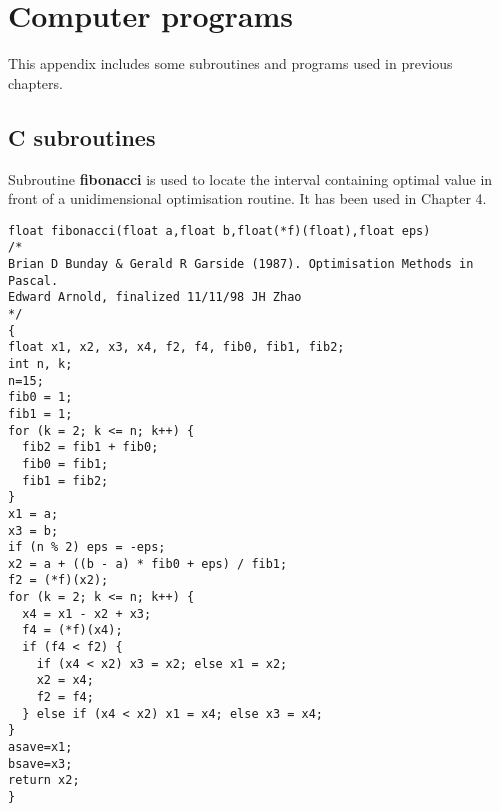\chapter{Computer programs}\label{programs}

This appendix includes some subroutines and programs used in previous chapters.

\section{C subroutines}
Subroutine {\bf fibonacci} is used to locate the interval containing optimal
value in front of a unidimensional optimisation routine.  It has been used in
Chapter 4.
\begin{verbatim}
float fibonacci(float a,float b,float(*f)(float),float eps)
/*
Brian D Bunday & Gerald R Garside (1987). Optimisation Methods in Pascal.
Edward Arnold, finalized 11/11/98 JH Zhao
*/
{
float x1, x2, x3, x4, f2, f4, fib0, fib1, fib2;
int n, k;
n=15;
fib0 = 1;
fib1 = 1;
for (k = 2; k <= n; k++) {
  fib2 = fib1 + fib0;
  fib0 = fib1;
  fib1 = fib2;
}
x1 = a;
x3 = b;
if (n % 2) eps = -eps;
x2 = a + ((b - a) * fib0 + eps) / fib1;
f2 = (*f)(x2);
for (k = 2; k <= n; k++) {
  x4 = x1 - x2 + x3;
  f4 = (*f)(x4);
  if (f4 < f2) {
    if (x4 < x2) x3 = x2; else x1 = x2;
    x2 = x4;
    f2 = f4;
  } else if (x4 < x2) x1 = x4; else x3 = x4;
}
asave=x1;
bsave=x3;
return x2;
}
\end{verbatim}

